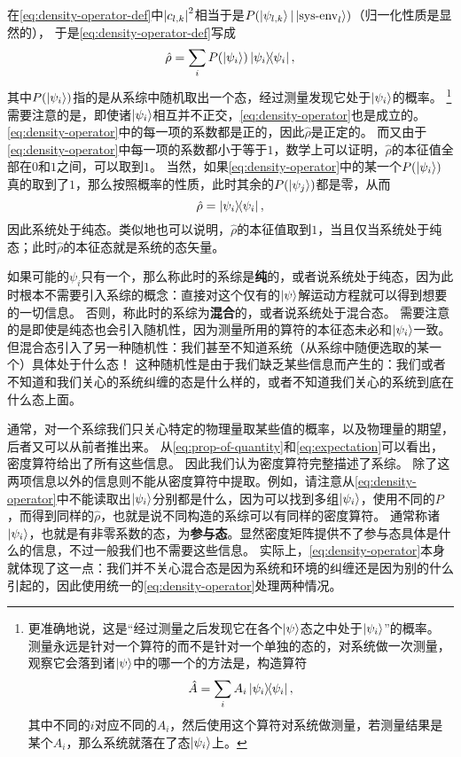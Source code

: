 \documentclass[hyperref, UTF8, a4paper]{ctexart}
\begin{document}
在\eqref{eq:density-operator-def}中$\abs{c_{l, k}}^2$相当于是$P(\ket{\psi_{l, k}}|\ket{\text{sys-env}_l})$（归一化性质是显然的），
于是\eqref{eq:density-operator-def}写成
\begin{equation}
    \hat{\rho} = \sum_{i} P(\ket{\psi_i}) \dyad{\psi_i},
    \label{eq:density-operator}
\end{equation}
其中$P(\ket{\psi_i})$指的是从系综中随机取出一个态，经过测量发现它处于$\ket{\psi_i}$的概率。%
\footnote{更准确地说，这是“经过测量之后发现它在各个$\ket{\psi}$态之中处于$\ket{\psi_i}$”的概率。
测量永远是针对一个算符的而不是针对一个单独的态的，对系统做一次测量，观察它会落到诸$\ket{\psi}$中的哪一个的方法是，构造算符
\[
    \hat{A} = \sum_i A_i \dyad{\psi_i},
\]
其中不同的$i$对应不同的$A_i$，然后使用这个算符对系统做测量，若测量结果是某个$A_i$，那么系统就落在了态$\ket{\psi_i}$上。}%
需要注意的是，即使诸$\ket{\psi_i}$相互并不正交，\eqref{eq:density-operator}也是成立的。
\eqref{eq:density-operator}中的每一项的系数都是正的，因此$\hat{\rho}$是正定的。
而又由于\eqref{eq:density-operator}中每一项的系数都小于等于$1$，数学上可以证明，$\hat{\rho}$的本征值全部在$0$和$1$之间，可以取到$1$。
当然，如果\eqref{eq:density-operator}中的某一个$P(\ket{\psi_i})$真的取到了$1$，那么按照概率的性质，此时其余的$P(\ket{\psi_j})$都是零，从而
\[
    \hat{\rho} = \dyad{\psi_i},
\]
因此系统处于纯态。类似地也可以说明，$\hat{\rho}$的本征值取到$1$，当且仅当系统处于纯态；此时$\hat{\rho}$的本征态就是系统的态矢量。

如果可能的$\psi_i$只有一个，那么称此时的系综是\textbf{纯}的，或者说系统处于纯态，因为此时根本不需要引入系综的概念：直接对这个仅有的$\ket{\psi}$解运动方程就可以得到想要的一切信息。
否则，称此时的系综为\textbf{混合}的，或者说系统处于混合态。
需要注意的是即使是纯态也会引入随机性，因为测量所用的算符的本征态未必和$\ket{\psi_i}$一致。
但混合态引入了另一种随机性：我们甚至不知道系统（从系综中随便选取的某一个）具体处于什么态！
这种随机性是由于我们缺乏某些信息而产生的：我们或者不知道和我们关心的系统纠缠的态是什么样的，或者不知道我们关心的系统到底在什么态上面。

通常，对一个系综我们只关心特定的物理量取某些值的概率，以及物理量的期望，后者又可以从前者推出来。
从\eqref{eq:prop-of-quantity}和\eqref{eq:expectation}可以看出，密度算符给出了所有这些信息。
因此我们认为密度算符完整描述了系综。
除了这两项信息以外的信息则不能从密度算符中提取。例如，请注意从\eqref{eq:density-operator}中不能读取出$\ket{\psi_i}$分别都是什么，因为可以找到多组$\ket{\psi_i}$，使用不同的$P$，而得到同样的$\hat{\rho}$，也就是说不同构造的系综可以有同样的密度算符。
通常称诸$\ket{\psi_i}$，也就是有非零系数的态，为\textbf{参与态}。显然密度矩阵提供不了参与态具体是什么的信息，不过一般我们也不需要这些信息。
实际上，\eqref{eq:density-operator}本身就体现了这一点：我们并不关心混合态是因为系统和环境的纠缠还是因为别的什么引起的，因此使用统一的\eqref{eq:density-operator}处理两种情况。
\end{document}
